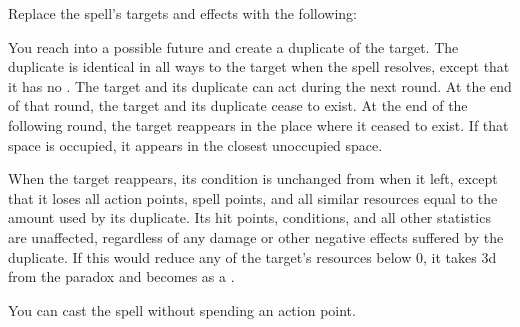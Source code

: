 


Replace the spell's targets and effects with the following:
\begin{spellcontent}

\begin{augmenttargetinginfo}




\end{augmenttargetinginfo}


\begin{augmenteffects}



\spelleffect
You reach into a possible future and create a duplicate of the target.
The duplicate is identical in all ways to the target when the spell resolves, except that it has no .
The target and its duplicate can act during the next round.
At the end of that round, the target and its duplicate cease to exist.
At the end of the following round, the target reappears in the place where it ceased to exist.
If that space is occupied, it appears in the closest unoccupied space.

When the target reappears, its condition is unchanged from when it left, except that it loses all action points, spell points, and all similar resources equal to the amount used by its duplicate.
Its hit points, conditions, and all other statistics are unaffected, regardless of any damage or other negative effects suffered by the duplicate.
If this would reduce any of the target's resources below 0, it takes  \plus3d from the paradox and becomes  as a .








\end{augmenteffects}

\end{spellcontent}





You can cast the spell without spending an action point.









